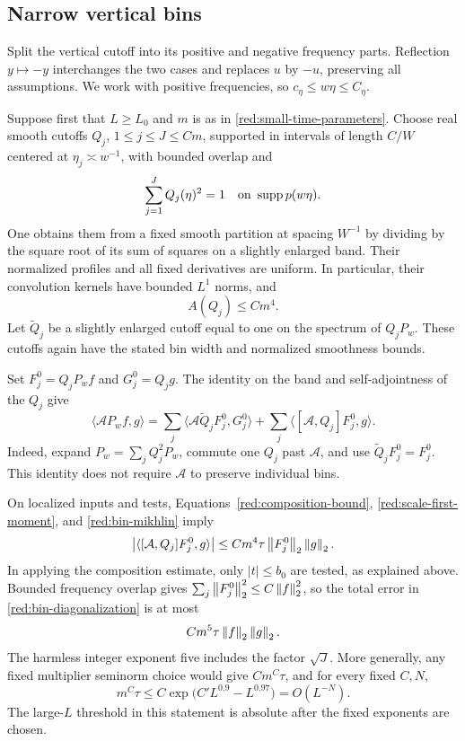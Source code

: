 \subsection{Narrow vertical bins}

Split the vertical cutoff into its positive and negative frequency
parts. Reflection \(y\mapsto-y\) interchanges the two cases and
replaces \(u\) by \(-u\), preserving all assumptions. We work
with positive frequencies, so \(c_\eta\le w\eta\le C_\eta\).

Suppose first that \(L\ge L_0\) and \(m\) is as in
\eqref{red:small-time-parameters}. Choose real smooth cutoffs
\(Q_j\), \(1\le j\le J\le C m\), supported in intervals of
length \(C/W\) centered at \(\eta_j\asymp w^{-1}\), with
bounded overlap and
\[
 \sum_{j=1}^J Q_j(\eta)^2=1
       \quad\text{on }\operatorname{supp} p(w\eta).
\]
One obtains them from a fixed smooth partition at spacing \(W^{-1}\)
by dividing by the square root of its sum of squares on a slightly
enlarged band. Their normalized profiles and all fixed derivatives
are uniform. In particular, their convolution kernels have bounded
\(L^1\) norms, and
\begin{equation}\label{red:bin-mikhlin}
 A(Q_j)\le C m^4.
\end{equation}
Let \(\widetilde Q_j\) be a slightly enlarged cutoff equal to one
on the spectrum of \(Q_jP_w\). These cutoffs again have the stated
bin width and normalized smoothness bounds.

Set \(F_j^0=Q_jP_wf\) and \(G_j^0=Q_jg\). The identity on the
band and self-adjointness of the \(Q_j\) give
\begin{equation}\label{red:bin-diagonalization}
 \langle\mathcal A P_wf,g\rangle
   =\sum_j\langle\mathcal A\widetilde Q_jF_j^0,G_j^0\rangle
      +\sum_j\langle[\mathcal A,Q_j]F_j^0,g\rangle.
\end{equation}
Indeed, expand \(P_w=\sum_jQ_j^2P_w\), commute one \(Q_j\)
past \(\mathcal A\), and use
\(\widetilde Q_jF_j^0=F_j^0\). This identity does not require
\(\mathcal A\) to preserve individual bins.

On localized inputs and tests, Equations~\eqref{red:composition-bound},
\eqref{red:scale-first-moment}, and \eqref{red:bin-mikhlin} imply
\[
 \left|\langle[\mathcal A,Q_j]F_j^0,g\rangle\right|
       \le C m^4\tau\left\|F_j^0\right\|_2\left\|g\right\|_2.
\]
In applying the composition estimate, only \(|t|\le b_0\) are
tested, as explained above. Bounded frequency overlap gives
\(\sum_j\left\|F_j^0\right\|_2^2\le C\left\|f\right\|_2^2\), so the total
error in \eqref{red:bin-diagonalization} is at most
\begin{equation}\label{red:bin-error}
 C m^5\tau\left\|f\right\|_2\left\|g\right\|_2.
\end{equation}
The harmless integer exponent five includes the factor
\(\sqrt J\). More generally, any fixed multiplier seminorm choice
would give \(C m^C\tau\), and for every fixed \(C,N\),
\begin{equation}\label{red:bin-error-small}
 m^C\tau
    \le C\exp\bigl(C' L^{0.9}-L^{0.97}\bigr)
    =O(L^{-N}).
\end{equation}
The large-\(L\) threshold in this statement is absolute after the
fixed exponents are chosen.

